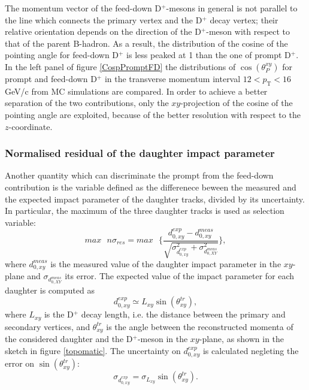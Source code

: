 \documentclass[b5paper,10pt,twoside,oldstyle,classica]{toptesi}
\newcommand{\pt}{p_\text{T}}
\begin{document}
The momentum vector of the feed-down D$^+$-mesons in general is not parallel to the line which connects the primary vertex and the D$^+$ decay vertex; their relative orientation depends on the direction of the D$^+$-meson with respect to that of the parent B-hadron. As a result, the distribution of the cosine of the pointing angle for feed-down D$^+$ is less peaked at 1 than the one of prompt D$^+$. In the left panel of figure \ref{CospPromptFD} the distributions of $\cos(\theta_P^{xy})$ for prompt and feed-down D$^+$ in the transverse momentum interval $12<\pt<16$ GeV/c from MC simulations are compared. In order to achieve a better separation of the two contributions, only the $xy$-projection of the cosine of the pointing angle are exploited, because of the better resolution with respect to the $z$-coordinate.   
\subsubsection{Normalised residual of the daughter impact parameter}
\label{topomatic_sec}
Another quantity which can discriminate the prompt from the feed-down contribution is the variable defined as the differenece beween the measured and the expected impact parameter of the daughter tracks, divided by its uncertainty. In particular, the maximum of the three daughter tracks is used as selection variable: 
\begin{equation}
 max\text{ }n\sigma_{res} = max\text{ }\bigg\{ \frac{d_{0,xy}^{exp}-d_{0,xy}^{meas}}{\sqrt{\sigma_{d_{0,xy}^{exp}}^2+\sigma_{d_{0,XY}^{meas}}^2}}\bigg\},
\end{equation}
where $d_{0,xy}^{meas}$ is the measured value of the daughter impact parameter in the $xy$-plane and $\sigma_{d_{0,XY}^{meas}}$ its error.
The expected value of the impact parameter for each daughter is computed as
\begin{equation}
 d_{0,xy}^{exp} \simeq L_{xy}\sin({\theta_{xy}^{tr}}),
\end{equation}
where $L_{xy}$ is the D$^+$ decay length, i.e. the distance between the primary and secondary vertices, and $\theta_{xy}^{tr}$ is the angle between the reconstructed momenta of the considered daughter and the D$^+$-meson in the $xy$-plane, as shown in the sketch in figure \ref{topomatic}. The uncertainty on $d_{0,xy}^{exp}$ is calculated negleting the error on $\sin({\theta_{xy}^{tr}})$:
\begin{equation}
 \sigma_{d_{0,xy}^{exp}} = \sigma_{L_{xy}}\sin({\theta_{xy}^{tr}}).
\end{equation}
\end{document}
